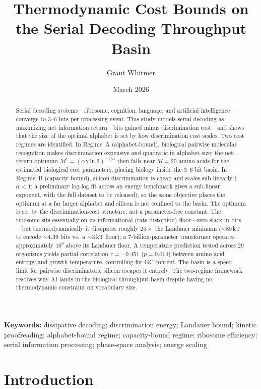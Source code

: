 \documentclass[11pt]{article}
\title{Thermodynamic Cost Bounds on the Serial Decoding Throughput Basin}
\author{Grant Whitmer}
\date{March 2026}
\begin{document}
\maketitle

\begin{abstract}
Serial decoding systems---ribosome, cognition, language, and artificial intelligence---converge to 3--6 bits per processing event. This study models serial decoding as maximizing net information return---bits gained minus discrimination cost---and shows that the size of the optimal alphabet is set by how discrimination cost scales. Two cost regimes are identified. In Regime~A (alphabet-bound), biological pairwise molecular recognition makes discrimination expensive and quadratic in alphabet size; the net-return optimum $M^*=(\alpha\gamma\ln 2)^{-1/\alpha}$ then falls near $M = 20$ amino acids for the estimated biological cost parameters, placing biology inside the 3--6 bit basin. In Regime~B (capacity-bound), silicon discrimination is cheap and scales sub-linearly ($\alpha < 1$; a preliminary log-log fit across an energy benchmark gives a sub-linear exponent, with the full dataset to be released), so the same objective places the optimum at a far larger alphabet and silicon is not confined to the basin. The optimum is set by the discrimination-cost structure, not a parameter-free constant. The ribosome sits essentially on its informational (rate-distortion) floor---zero slack in bits---but thermodynamically it dissipates roughly $25\times$ the Landauer minimum ($\sim$80\,kT to encode $\sim$4.39 bits vs.\ a $\sim$3\,kT floor); a 7-billion-parameter transformer operates approximately $10^9$ above its Landauer floor. A temperature prediction tested across 29 organisms yields partial correlation $r = -0.451$ ($p = 0.014$) between amino acid entropy and growth temperature, controlling for GC-content. The basin is a speed limit for pairwise discriminators; silicon escapes it entirely. The two-regime framework resolves why AI lands in the biological throughput basin despite having no thermodynamic constraint on vocabulary size.
\end{abstract}

\noindent\textbf{Keywords:} dissipative decoding; discrimination energy; Landauer bound; kinetic proofreading; alphabet-bound regime; capacity-bound regime; ribosome efficiency; serial information processing; phase-space analysis; energy scaling

\section{Introduction}
\end{document}
